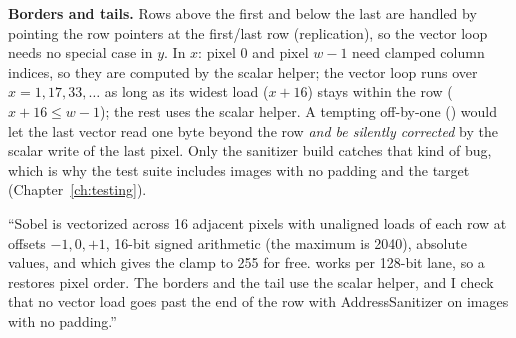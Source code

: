 \begin{plain}
\textbf{Borders and tails.} Rows above the first and below the last are handled by pointing the row pointers at the first/last row (replication), so the vector loop needs no special case in $y$. In $x$: pixel 0 and pixel $w-1$ need clamped column indices, so they are computed by the scalar helper; the vector loop runs over $x=1,17,33,\dots$ as long as its widest load ($x+16$) stays within the row ($x+16\le w-1$); the rest uses the scalar helper. A tempting off-by-one () would let the last vector read one byte beyond the row \emph{and be silently corrected} by the scalar write of the last pixel. Only the sanitizer build catches that kind of bug, which is why the test suite includes images with no padding and the  target (Chapter~\ref{ch:testing}).
\end{plain}

\begin{sound}
``Sobel is vectorized across 16 adjacent pixels with unaligned loads of each row at offsets $-1,0,+1$, 16-bit signed arithmetic (the maximum is 2040), absolute values, and  which gives the clamp to 255 for free.  works per 128-bit lane, so a  restores pixel order. The borders and the tail use the scalar helper, and I check that no vector load goes past the end of the row with AddressSanitizer on images with no padding.''
\end{sound}
